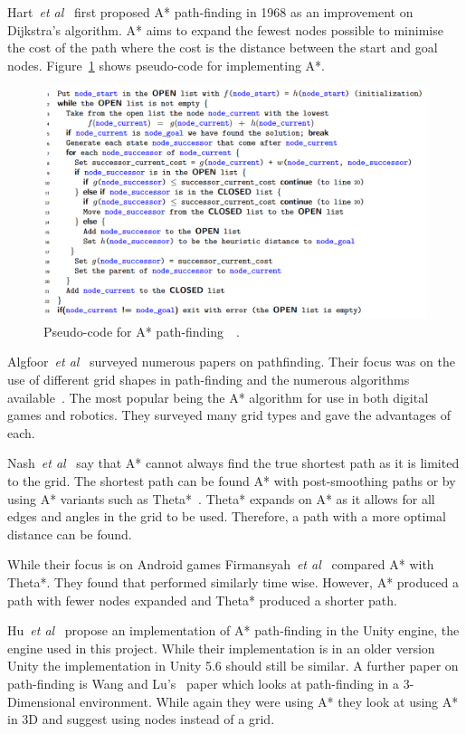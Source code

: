\documentclass[journal]{IEEEtran}
\begin{document}
	Hart~\textit{et al}~\cite{Hart1968} first proposed A* path-finding in 1968 as an improvement on Dijkstra's algorithm. A* aims to expand the fewest nodes possible to minimise the cost of the path where the cost is the distance between the start and goal nodes. Figure~\ref{A*Pseudo} shows pseudo-code for implementing A*. 
	
	\begin{figure}[H]
		\includegraphics[width=1.0\linewidth]{APseudocode.png}
		\caption{Pseudo-code for A* path-finding~\cite{Hart1968}~\cite{pseudocode:A*}.}
		\label{A*Pseudo}
	\end{figure} 
	
	Algfoor~\textit{et al}~\cite{Algfoor2015} surveyed numerous papers on pathfinding. Their focus was on the use of different grid shapes in path-finding and the numerous algorithms available~\cite{Algfoor2015}. The most popular being the A* algorithm for use in both digital games and robotics. They surveyed many grid types and gave the advantages of each. 
	
	Nash~\textit{et al}~\cite{Nash2007} say that A* cannot always find the true shortest path as it is limited to the grid. The shortest path can be found A* with post-smoothing paths or by using A* variants such as Theta*~\cite{Nash2007, Firmansyah2016}. Theta* expands on A* as it allows for all edges and angles in the grid to be used. Therefore, a path with a more optimal distance can be found.
	
	While their focus is on Android games Firmansyah~\textit{et al}~\cite{Firmansyah2016} compared A* with Theta*. They found that performed similarly time wise. However, A* produced a path with fewer nodes expanded and Theta* produced a shorter path. 
	
	Hu~\textit{et al}~\cite{Hu2012} propose an implementation of A* path-finding in the Unity engine, the engine used in this project.  While their implementation is in an older version Unity the implementation in Unity 5.6 should still be similar. A further paper on path-finding is Wang and Lu's~\cite{wang2012} paper which looks at path-finding in a 3-Dimensional environment. While again they were using A* they look at using A* in 3D and suggest using nodes instead of a grid.
	
\end{document}
